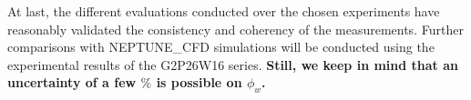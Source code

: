 At last, the different evaluations conducted over the chosen experiments have reasonably validated the consistency and coherency of the measurements. Further comparisons with NEPTUNE\_CFD simulations will be conducted using the experimental results of the G2P26W16 series. \textbf{ Still, we keep in mind that an uncertainty of a few $\%$ is possible on $\phi_{w}$.}